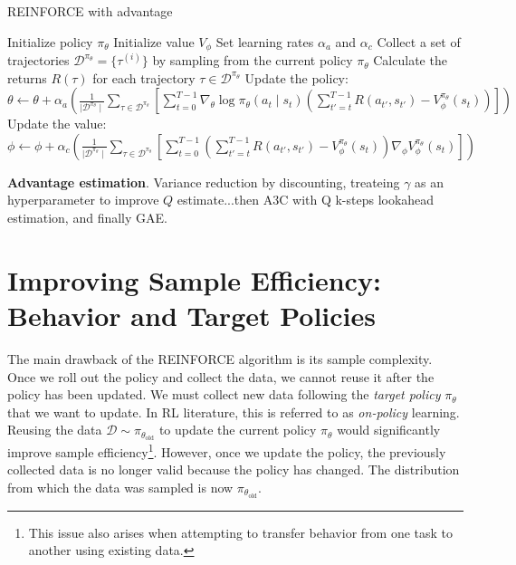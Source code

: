 \begin{algorithm}
    \caption{REINFORCE with advantage}
    \begin{algorithmic}
    \STATE Initialize policy $\pi_{\theta}$
    \STATE Initialize value $V_{\phi}$
    \STATE Set learning rates $\alpha_{a}$ and $\alpha_{c}$
        \STATE Collect a set of trajectories $\mathcal{D}^{\pi_{\theta}}=\{\tau^{(i)}\}$ by sampling from the current policy $\pi_{\theta}$
        \STATE Calculate the returns $R(\tau)$ for each trajectory $\tau\in\mathcal{D}^{\pi_{\theta}}$
        \STATE Update the policy:
        \STATE \qquad$\theta \leftarrow \theta + \alpha_{a} \left(\frac{1}{\mid\mathcal{D^{\pi_{\theta}}}\mid}\sum_{\tau\in\mathcal{D}^{\pi_{\theta}}}\left[\sum_{t=0}^{T-1}\nabla_{\theta}\log\pi_{\theta}(a_{t}\mid s_{t})\left(\sum_{t'=t}^{T-1} R(a_{t'}, s_{t'}) - V_{\phi}^{\pi_{\theta}}(s_{t})\right)\right]\right)$
        \STATE Update the value:
        \STATE \qquad $\phi \leftarrow \phi + \alpha_{c} \left(\frac{1}{\mid\mathcal{D}^{\pi_{\theta}}\mid}\sum_{\tau\in\mathcal{D}^{\pi_{\theta}}}\left[\sum_{t=0}^{T-1}\left(\sum_{t'=t}^{T-1} R(a_{t'}, s_{t'}) - V_{\phi}^{\pi_{\theta}}(s_{t})\right)\nabla_{\phi}V_{\phi}^{\pi_{\theta}}(s_{t})\right]\right)$
    \ENDFOR
    \end{algorithmic}
\end{algorithm}

\noindent \textbf{Advantage estimation}. Variance reduction by discounting, treateing $\gamma$ as an hyperparameter to improve $Q$ estimate...then A3C with Q k-steps lookahead estimation, and finally GAE. 


\section{Improving Sample Efficiency: Behavior and Target Policies}


The main drawback of the REINFORCE algorithm is its sample complexity. Once we roll out the policy and collect the data, we cannot reuse it after the policy has been updated. We must collect new data following the \textit{target policy} $\pi_{\theta}$ that we want to update. In RL literature, this is referred to as \textit{on-policy} learning. Reusing the data $\mathcal{D}\sim\pi_{\theta_{\text{old}}}$ to update the current policy $\pi_{\theta}$ would significantly improve sample efficiency\footnote{This issue also arises when attempting to transfer behavior from one task to another using existing data.}. However, once we update the policy, the previously collected data is no longer valid because the policy has changed. The distribution from which the data was sampled is now $\pi_{\theta_{\text{old}}}$. \\

